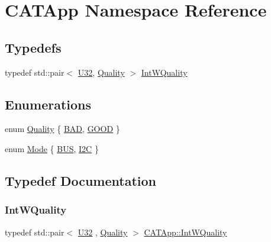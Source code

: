 \hypertarget{namespaceCATApp}{}\section{C\+A\+T\+App Namespace Reference}
\label{namespaceCATApp}
\subsection*{Typedefs}
\begin{DoxyCompactItemize}
\item 
typedef std\+::pair$<$ \hyperlink{ICECALv3_8h_a811024d35b9b8a41095b1f583b649e56}{U32}, \hyperlink{namespaceCATApp_a10d106f6dbef9da3b1ba48892278b9c4}{Quality} $>$ \hyperlink{namespaceCATApp_abdd559c4b60ffcd177a8aabe5b7e4d38}{Int\+W\+Quality}
\end{DoxyCompactItemize}
\subsection*{Enumerations}
\begin{DoxyCompactItemize}
\item 
enum \hyperlink{namespaceCATApp_a10d106f6dbef9da3b1ba48892278b9c4}{Quality} \{ \hyperlink{namespaceCATApp_a10d106f6dbef9da3b1ba48892278b9c4acd3ed67aaacefc43a8086122a4b2ff11}{B\+AD}, 
\hyperlink{namespaceCATApp_a10d106f6dbef9da3b1ba48892278b9c4a38777cb47f97b9703919e12ca841f9a3}{G\+O\+OD}
 \}
\item 
enum \hyperlink{namespaceCATApp_addde02095b318dd29aad22bf91fbf5c7}{Mode} \{ \hyperlink{namespaceCATApp_addde02095b318dd29aad22bf91fbf5c7aa5eeb9b5908cf99ffe6cd93cf235579d}{B\+US}, 
\hyperlink{namespaceCATApp_addde02095b318dd29aad22bf91fbf5c7af0a8d8add7a4fb23e99e6ea6e09e5a59}{I2C}
 \}
\end{DoxyCompactItemize}


\subsection{Typedef Documentation}
\mbox{\label{namespaceCATApp_abdd559c4b60ffcd177a8aabe5b7e4d38}} 
\subsubsection{\texorpdfstring{Int\+W\+Quality}{IntWQuality}}
{\footnotesize\ttfamily typedef std\+::pair$<$ \hyperlink{ICECALv3_8h_a811024d35b9b8a41095b1f583b649e56}{U32} , \hyperlink{namespaceCATApp_a10d106f6dbef9da3b1ba48892278b9c4}{Quality} $>$ \hyperlink{namespaceCATApp_abdd559c4b60ffcd177a8aabe5b7e4d38}{C\+A\+T\+App\+::\+Int\+W\+Quality}}



